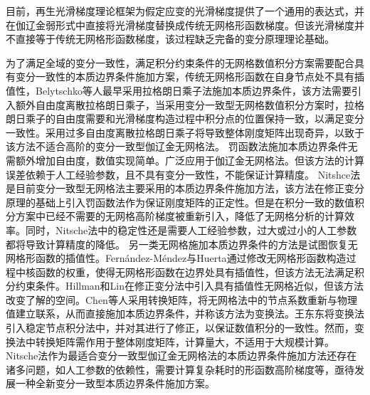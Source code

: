 目前，再生光滑梯度理论框架为假定应变的光滑梯度提供了一个通用的表达式，并在伽辽金弱形式中直接将光滑梯度替换成传统无网格形函数梯度。但该光滑梯度并不直接等于传统无网格形函数梯度，该过程缺乏完备的变分原理理论基础。\par
为了满足全域的变分一致性，满足积分约束条件的无网格数值积分方案需要配合具有变分一致性的本质边界条件施加方案，传统无网格形函数在自身节点处不具有插值性，Belytschko等人\textsuperscript{\cite{belytschko1994}}最早采用拉格朗日乘子法施加本质边界条件，该方法需要引入额外自由度离散拉格朗日乘子，当采用变分一致型无网格数值积分方案时，拉格朗日乘子的自由度需要和光滑梯度构造过程中积分点的位置保持一致，以满足变分一致性。采用过多自由度离散拉格朗日乘子将导致整体刚度矩阵出现奇异，以致于该方法不适合高阶的变分一致型伽辽金无网格法。
罚函数法\textsuperscript{\cite{zhu1998}}施加本质边界条件无需额外增加自由度，数值实现简单。广泛应用于伽辽金无网格法。但该方法的计算误差依赖于人工经验参数，且不具有变分一致性，不能保证计算精度。
Nitshce法\textsuperscript{\cite{fernandez-mendez2004}}是目前变分一致型无网格法主要采用的本质边界条件施加方法，该方法在修正变分原理的基础上引入罚函数法作为保证刚度矩阵的正定性。但是在积分一致的数值积分方案中已经不需要的无网格高阶梯度被重新引入，降低了无网格分析的计算效率。同时，Nitsche法中的稳定性还是需要人工经验参数，过大或过小的人工参数都将导致计算精度的降低。
另一类无网格施加本质边界条件的方法是试图恢复无网格形函数的插值性。Fernández-Méndez与Huerta\textsuperscript{\cite{fernandez-mendez2004}}通过修改无网格形函数构造过程中核函数的权重，使得无网格形函数在边界处具有插值性，但该方法无法满足积分约束条件。Hillman和Lin\textsuperscript{\cite{hillman2021}}在修正变分法中引入具有插值性无网格近似，但该方法改变了解的空间。Chen等人\textsuperscript{\cite{chen1996}}采用转换矩阵，将无网格法中的节点系数重新与物理值建立联系，从而直接施加本质边界条件，并称该方法为变换法。王东东\textsuperscript{\cite{wang2015}}将变换法引入稳定节点积分法中，并对其进行了修正，以保证数值积分的一致性。然而，变换法中转换矩阵需作用于整体刚度矩阵，计算量大，不适用于大规模计算。
Nitsche法作为最适合变分一致型伽辽金无网格法的本质边界条件施加方法还存在诸多问题，如人工参数的依赖性，需要计算复杂耗时的形函数高阶梯度等，亟待发展一种全新变分一致型本质边界条件施加方案。
